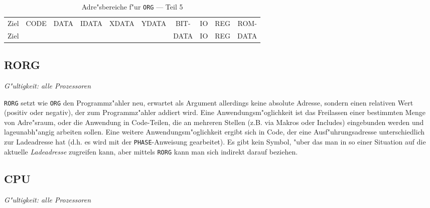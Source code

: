 \documentclass[12pt,a4paper,twoside]{report}
\makeatletter
\newcommand{\tty}[1]{{\tt #1}}
\newcommand{\tin}[1]{{\scriptsize #1}}
\newcommand{\ttindex}[1]{\index{#1@{\tt #1}}}
\makeatother
\begin{document}
\clearpage
\begin{table*}[htbp]
\begin{center}\begin{tabular}{|l|c|c|c|c|c|c|c|c|c|}
\hline
\tin{Ziel} & \tin{CODE} & \tin{DATA} & \tin{IDATA} & \tin{XDATA} & \tin{YDATA} & \tin{BIT-} & \tin{IO} & \tin{REG} & \tin{ROM-} \\
\tin{Ziel} &            &            &             &             &             & \tin{DATA} & \tin{IO} & \tin{REG} & \tin{DATA} \\
\hline
\hline

\hline
\end{tabular}\end{center}
\caption{Adre"sbereiche f"ur \tty{ORG} --- Teil 5\label{TabORG5}}
\end{table*}


\subsection{RORG}
\label{SectRORG}
\ttindex{RORG}

{\em G"ultigkeit: alle Prozessoren}

\tty{RORG} setzt wie \tty{ORG} den Programmz"ahler neu, erwartet
als Argument allerdings keine absolute Adresse, sondern einen
relativen Wert (positiv oder negativ), der zum Programmz"ahler
addiert wird.  Eine Anwendungsm"oglichkeit ist das Freilassen
einer bestimmten Menge von Adre"sraum, oder die Anwendung in
Code-Teilen, die an mehreren Stellen (z.B. via Makros oder
Includes) eingebunden werden und lageunabh"angig arbeiten sollen. 
Eine weitere Anwendungsm"oglichkeit ergibt sich in Code, der eine
Ausf"uhrungsadresse unterschiedlich zur Ladeadresse hat (d.h. es
wird mit der \tty{PHASE}-Anweisung gearbeitet).  Es gibt kein
Symbol, "uber das man in so einer Situation auf die aktuelle
{\em Ladeadresse} zugreifen kann, aber mittels \tty{RORG} kann man
sich indirekt darauf beziehen.


\subsection{CPU}
\ttindex{CPU}

{\em G"ultigkeit: alle Prozessoren}
\end{document}
